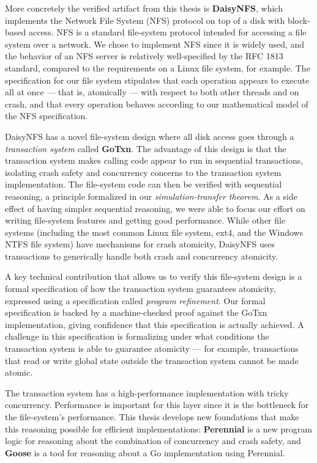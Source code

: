 More concretely the verified
artifact from this thesis is \textbf{DaisyNFS}, which implements the Network
File System (NFS) protocol on top of a disk with block-based access. NFS is a
standard file-system protocol intended for accessing a file system over a network.
We chose to
implement NFS since it is widely used, and the behavior of an NFS server is relatively well-specified
by the RFC 1813 standard, compared to the requirements on a Linux file system,
for example. The specification for our file system stipulates that each
operation appears to execute all at once --- that is, atomically --- with
respect to both other threads and on crash, and that every operation behaves
according to our mathematical model of the NFS specification.

DaisyNFS has a novel file-system design where all disk access goes through a
\emph{transaction system} called \textbf{GoTxn}. The advantage of this design is that the
transaction system makes calling code appear to run in sequential transactions,
isolating crash safety and concurrency concerns to the transaction system
implementation. The file-system code can then be verified with sequential
reasoning, a principle formalized in our \emph{simulation-transfer theorem}.
As a side effect of having simpler sequential reasoning, we were
able to focus our effort on writing file-system features and getting good
performance. While other file systems (including the most common Linux file
system, ext4, and the Windows NTFS file system) have mechanisms for crash atomicity, DaisyNFS
uses transactions to generically handle both crash and concurrency atomicity.

A key technical contribution that allows us to verify this file-system design is
a formal specification of how the transaction system guarantees atomicity,
expressed using a specification called \emph{program refinement}. Our
formal specification is backed by a machine-checked proof against the GoTxn
implementation, giving confidence that this specification is actually achieved.
A challenge in this specification is formalizing under what conditions the
transaction system is able to guarantee atomicity --- for example, transactions
that read or write global state outside the transaction system cannot be made atomic.

The transaction system has a high-performance implementation with tricky
concurrency. Performance is important for this layer since it is the
bottleneck for the file-system's performance. This thesis develops new
foundations that make this reasoning possible for efficient implementations:
\textbf{Perennial} is a new program logic for
reasoning about the combination of concurrency and crash safety, and
\textbf{Goose} is a tool for reasoning about a Go implementation using Perennial.


